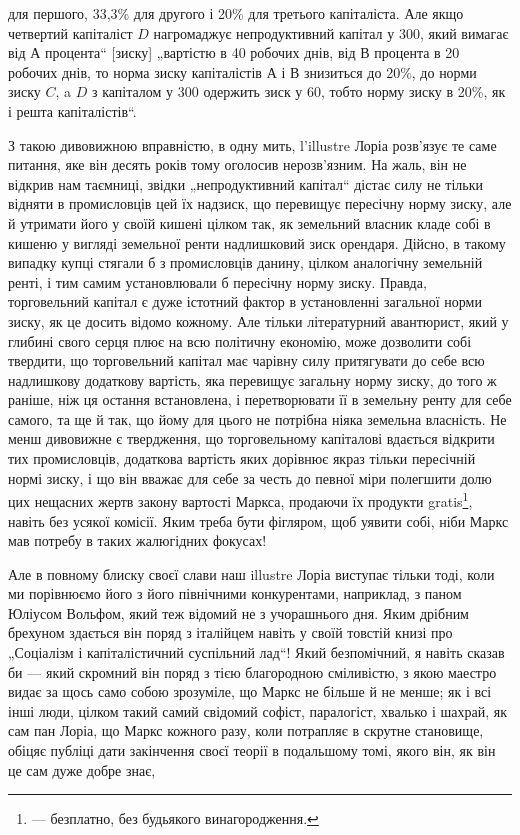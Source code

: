 \parcont{}  %
для першого, 33,3\%  для другого і 20\% для третього капіталіста.
Але якщо четвертий капіталіст $D$ нагромаджує непродуктивний
капітал у 300, який вимагає від $А$ процента“ [зиску]
„вартістю в 40 робочих днів, від $В$ процента в 20 робочих днів,
то норма зиску капіталістів $А$ і $В$ знизиться до 20\%, до норми
зиску $C$, a $D$ з капіталом у 300 одержить зиск у 60, тобто
норму зиску в 20\%, як і решта капіталістів“.

З такою дивовижною вправністю, в одну мить, l’illustre Лоріа
розв’язує те саме питання, яке він десять років тому оголосив
нерозв’язним. На жаль, він не відкрив нам таємниці, звідки
„непродуктивний капітал“ дістає силу не тільки відняти в промисловців
цей їх надзиск, що перевищує пересічну норму
зиску, але й утримати його у своїй кишені цілком так, як земельний
власник кладе собі в кишеню у вигляді земельної ренти надлишковий
зиск орендаря. Дійсно, в такому випадку купці стягали
б з промисловців данину, цілком аналогічну земельній ренті,
і тим самим установлювали б пересічну норму зиску. Правда,
торговельний капітал є дуже істотний фактор в установленні
загальної норми зиску, як це досить відомо кожному. Але тільки
літературний авантюрист, який у глибині свого серця плює на
всю політичну економію, може дозволити собі твердити, що
торговельний капітал має чарівну силу притягувати до себе
всю надлишкову додаткову вартість, яка перевищує загальну
норму зиску, до того ж раніше, ніж ця остання встановлена,
і перетворювати її в земельну ренту для себе самого, та ще
й так, що йому для цього не потрібна ніяка земельна власність.
Не менш дивовижне є твердження, що торговельному капіталові
вдається відкрити тих промисловців, додаткова вартість яких
дорівнює якраз тільки пересічній нормі зиску, і що він вважає для
себе за честь до певної міри полегшити долю цих нещасних жертв
закону вартості Маркса, продаючи їх продукти gratis\footnote*{
— безплатно, без будьякого винагородження. 
}, навіть
без усякої комісії. Яким треба бути фігляром, щоб уявити собі,
ніби Маркс мав потребу в таких жалюгідних фокусах!

Але в повному блиску своєї слави наш illustre Лоріа виступає
тільки тоді, коли ми порівнюємо його з його північними
конкурентами, наприклад, з паном Юліусом Вольфом, який теж
відомий не з учорашнього дня. Яким дрібним брехуном здається він
поряд з італійцем навіть у своїй товстій книзі про „Соціалізм
і капіталістичний суспільний лад“! Який безпомічний, я навіть
сказав би — який скромний він поряд з тією благородною сміливістю,
з якою маестро видає за щось само собою зрозуміле,
що Маркс не більше й не менше; як і всі інші люди, цілком
такий самий свідомий софіст, паралогіст, хвалько і шахрай, як
сам пан Лоріа, що Маркс кожного разу, коли потрапляє в
скрутне становище, обіцяє публіці дати закінчення своєї теорії
в подальшому томі, якого він, як він це сам дуже добре знає,
\parbreak{}  %
